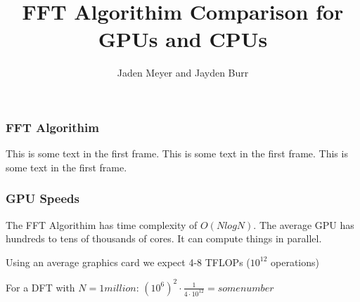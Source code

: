 \documentclass{beamer}
\title{FFT Algorithim Comparison for GPUs and CPUs}
\author{Jaden Meyer and Jayden Burr}
\begin{document}
\frame{\titlepage}

\begin{frame}
\frametitle{FFT Algorithim}
This is some text in the first frame. This is some text in the first frame. This is some text in the first frame.
\end{frame}

\begin{frame}
\frametitle{GPU Speeds}
The FFT Algorithim has time complexity of $O(NlogN)$. The average GPU has hundreds to tens of thousands of cores. It can compute things in parallel.

Using an average graphics card we expect 4-8 TFLOPs ($10^{12}$ operations)

For a DFT with $N = 1 million$: $ (10^6)^2 \cdot \frac{1}{4\cdot10^{12}} = some number$

\end{frame}
\end{document}
